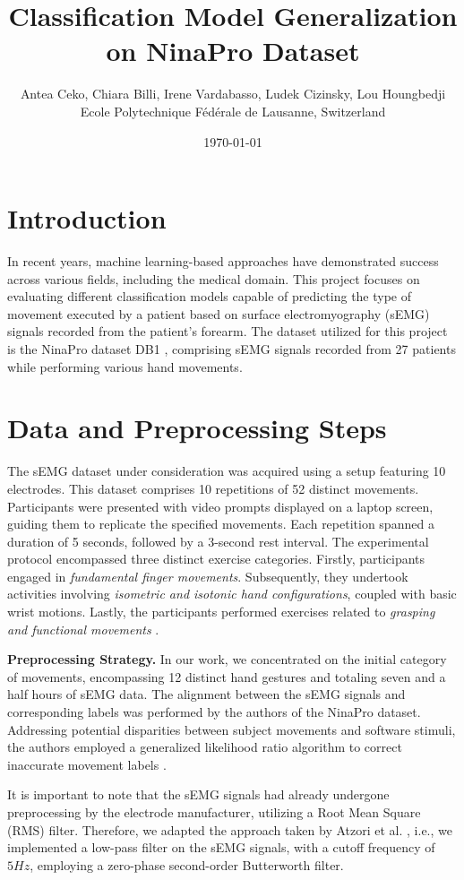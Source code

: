 \documentclass[10pt]{article}
\title{
    \vspace{-2cm}Classification Model Generalization on NinaPro Dataset
}
\author{
    \vspace{0.2cm}Antea Ceko, Chiara Billi, Irene Vardabasso, Ludek Cizinsky, Lou Houngbedji \\
    \vspace{0.2cm} \normalsize{Ecole Polytechnique Fédérale de Lausanne, Switzerland}
}
\date{\today}
\begin{document}
\maketitle

\section{Introduction}
In recent years, machine learning-based approaches have demonstrated success across various fields,  including the medical domain. 
This project focuses on evaluating different classification models capable of predicting the type of movement executed by a patient based on surface electromyography (sEMG) signals recorded 
from the patient's forearm. The dataset utilized for this project is the NinaPro dataset DB1 \cite{ninapro}, 
comprising sEMG signals recorded from 27 patients while performing various hand movements.

\section{Data and Preprocessing Steps}
The sEMG dataset under consideration was acquired using a setup featuring 10 electrodes. 
This dataset comprises 10 repetitions of 52 distinct movements. 
Participants were presented with video prompts displayed on a laptop screen, 
guiding them to replicate the specified movements. Each repetition spanned a duration of 
5 seconds, followed by a 3-second rest interval. The experimental protocol encompassed three distinct exercise categories. 
Firstly, participants engaged in \textit{fundamental finger movements}. 
Subsequently, they undertook activities involving \textit{isometric and isotonic hand configurations}, 
coupled with basic wrist motions. Lastly, the participants performed exercises related to \textit{grasping and functional movements} \cite{ninapro}.

\textbf{Preprocessing Strategy.} In our work, we concentrated on the initial category of movements, encompassing 12 distinct hand gestures and totaling seven and a half hours of sEMG data. 
The alignment between the sEMG signals and corresponding labels was performed by the authors of the NinaPro dataset. 
Addressing potential disparities between subject movements and software stimuli, the authors employed a generalized likelihood ratio algorithm to 
correct inaccurate movement labels \cite{ninapro}.

It is important to note that the sEMG signals had already undergone preprocessing by the electrode manufacturer, 
utilizing a Root Mean Square (RMS) filter. Therefore, we adapted the approach taken by Atzori et al. \cite{ninapro}, i.e., 
we implemented a low-pass filter on the sEMG signals, with a cutoff frequency of $5 Hz$, employing a zero-phase second-order Butterworth filter.
\end{document}
